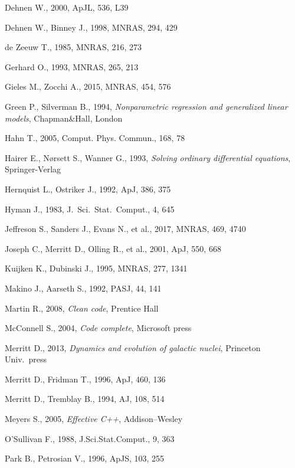 \documentclass[12pt]{article}
\begin{document}
\begin{thebibliography}{99}
Dehnen W., 2000, ApJL, 536, L39

Dehnen W., Binney J., 1998, MNRAS, 294, 429

de Zeeuw T., 1985, MNRAS, 216, 273

Gerhard O., 1993, MNRAS, 265, 213

Gieles M., Zocchi A., 2015, MNRAS, 454, 576

Green P., Silverman B., 1994, \textsl{Nonparametric regression and generalized linear models}, Chapman\&Hall, London

Hahn T., 2005, Comput. Phys. Commun., 168, 78

Hairer E., N{\o}rsett S., Wanner G., 1993, \textsl{Solving ordinary differential equations}, Springer-Verlag

Hernquist L., Ostriker J., 1992, ApJ, 386, 375

Hyman J., 1983, J.~Sci.~Stat.~Comput., 4, 645

Jeffreson S., Sanders J., Evans N., et al., 2017, MNRAS, 469, 4740

Joseph C., Merritt D., Olling R., et al., 2001, ApJ, 550, 668

Kuijken K., Dubinski J., 1995, MNRAS, 277, 1341

Makino J., Aarseth S., 1992, PASJ, 44, 141

Martin R., 2008, \textsl{Clean code}, Prentice Hall

McConnell S., 2004, \textsl{Code complete}, Microsoft press

Merritt D., 2013, \textsl{Dynamics and evolution of galactic nuclei}, Princeton Univ.\ press

Merritt D., Fridman T., 1996, ApJ, 460, 136

Merritt D., Tremblay B., 1994, AJ, 108, 514

Meyers S., 2005, \textsl{Effective C++}, Addison--Wesley

O'Sullivan F., 1988, J.Sci.Stat.Comput., 9, 363

Park B., Petrosian V., 1996, ApJS, 103, 255


\end{thebibliography}
\end{document}
